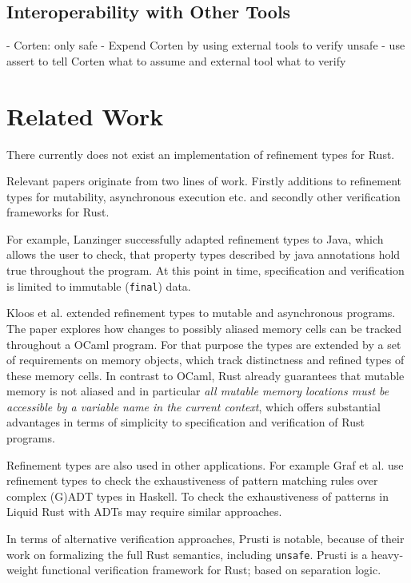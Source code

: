 \documentclass{book}
\newcommand{\code}[1]{\texttt{#1}}
\theoremstyle{definition}
\begin{document}
\section{Interoperability with Other Tools}

- Corten: only safe
- Expend Corten by using external tools to verify unsafe
- use assert to tell Corten what to assume and external tool what to verify

\chapter{Related Work}

There currently does not exist an implementation of refinement types for Rust.

Relevant papers originate from two lines of work. Firstly additions to refinement types for mutability, asynchronous execution etc. and secondly other verification frameworks for Rust.

For example, Lanzinger \cite{lanzinger_property_2021} successfully adapted refinement types to Java, which allows the user to check, that property types described by java annotations hold true throughout the program. At this point in time, specification and verification is limited to immutable (\code{final}) data.

Kloos et al. \cite{kloos_asynchronous_2015} extended refinement types to mutable and asynchronous programs. The paper explores how changes to possibly aliased memory cells can be tracked throughout a OCaml program. For that purpose the types are extended by a set of requirements on memory objects, which track distinctness and refined types of these memory cells. In contrast to OCaml, Rust already guarantees that mutable memory is not aliased and in particular \textit{all mutable memory locations must be accessible by a variable name in the current context}, which offers substantial advantages in terms of simplicity to specification and verification of Rust programs.

Refinement types are also used in other applications. For example Graf et al. \cite{graf_lower_2020} use refinement types to check the exhaustiveness of pattern matching rules over complex (G)ADT types in Haskell. To check the exhaustiveness of patterns in Liquid Rust with ADTs may require similar approaches.

In terms of alternative verification approaches, Prusti\cite{astrauskas_leveraging_2019} is notable, because of their work on formalizing the full Rust semantics, including \code{unsafe}. Prusti is a heavy-weight functional verification framework for Rust; based on separation logic.
\end{document}
